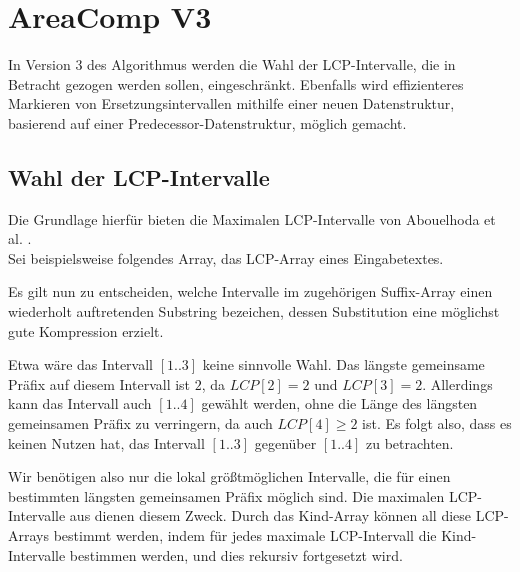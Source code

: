 \section{AreaComp V3}

In Version 3 des Algorithmus werden die Wahl der LCP-Intervalle, die in Betracht gezogen werden sollen, eingeschränkt. Ebenfalls wird effizienteres Markieren von Ersetzungsintervallen mithilfe einer neuen Datenstruktur, basierend auf einer Predecessor-Datenstruktur, möglich gemacht. 

\subsection{Wahl der LCP-Intervalle}

Die Grundlage hierfür bieten die Maximalen LCP-Intervalle von Abouelhoda et al. \cite{abouelhoda_optimal_2002}.\\
Sei beispielsweise folgendes Array, das LCP-Array eines Eingabetextes. 
\begin{figure}[H]
	\centering
\end{figure}
Es gilt nun zu entscheiden, welche Intervalle im zugehörigen Suffix-Array einen wiederholt auftretenden Substring bezeichen, dessen Substitution eine möglichst gute Kompression erzielt.

Etwa wäre das Intervall $[1..3]$ keine sinnvolle Wahl. Das längste gemeinsame Präfix auf diesem Intervall ist $2$, da $LCP[2] = 2$ und $LCP[3] = 2$. Allerdings kann das Intervall auch $[1..4]$ gewählt werden, ohne die Länge des längsten gemeinsamen Präfix zu verringern, da auch $LCP[4] \geq 2$ ist. 
Es folgt also, dass es keinen Nutzen hat, das Intervall $[1..3]$ gegenüber $[1..4]$ zu betrachten.

Wir benötigen also nur die lokal größtmöglichen Intervalle, die für einen bestimmten längsten gemeinsamen Präfix möglich sind. Die maximalen LCP-Intervalle aus \cite{abouelhoda_optimal_2002} dienen diesem Zweck. Durch das Kind-Array können all diese LCP-Arrays bestimmt werden, indem für jedes maximale LCP-Intervall die Kind-Intervalle bestimmen werden, und dies rekursiv fortgesetzt wird.

